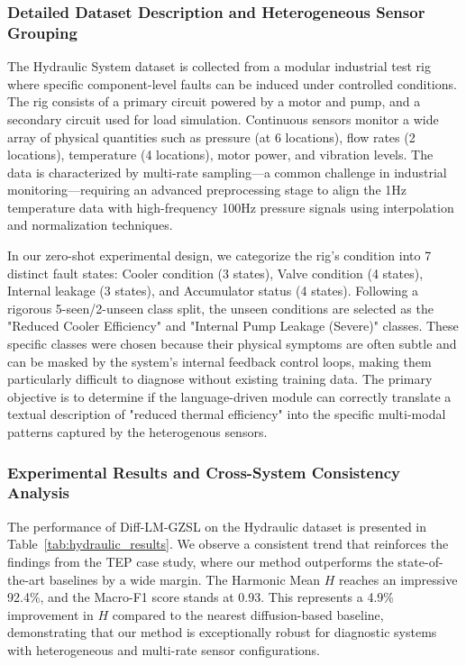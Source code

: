 \documentclass[journal]{IEEEtran}
\begin{document}
\subsubsection{Detailed Dataset Description and Heterogeneous Sensor Grouping}
The Hydraulic System dataset is collected from a modular industrial test rig where specific component-level faults can be induced under controlled conditions. The rig consists of a primary circuit powered by a motor and pump, and a secondary circuit used for load simulation. Continuous sensors monitor a wide array of physical quantities such as pressure (at 6 locations), flow rates (2 locations), temperature (4 locations), motor power, and vibration levels. The data is characterized by multi-rate sampling—a common challenge in industrial monitoring—requiring an advanced preprocessing stage to align the 1Hz temperature data with high-frequency 100Hz pressure signals using interpolation and normalization techniques.

In our zero-shot experimental design, we categorize the rig's condition into 7 distinct fault states: Cooler condition (3 states), Valve condition (4 states), Internal leakage (3 states), and Accumulator status (4 states). Following a rigorous 5-seen/2-unseen class split, the unseen conditions are selected as the "Reduced Cooler Efficiency" and "Internal Pump Leakage (Severe)" classes. These specific classes were chosen because their physical symptoms are often subtle and can be masked by the system's internal feedback control loops, making them particularly difficult to diagnose without existing training data. The primary objective is to determine if the language-driven module can correctly translate a textual description of "reduced thermal efficiency" into the specific multi-modal patterns captured by the heterogenous sensors.

\subsubsection{Experimental Results and Cross-System Consistency Analysis}
The performance of Diff-LM-GZSL on the Hydraulic dataset is presented in Table~\ref{tab:hydraulic_results}. We observe a consistent trend that reinforces the findings from the TEP case study, where our method outperforms the state-of-the-art baselines by a wide margin. The Harmonic Mean $H$ reaches an impressive 92.4\%, and the Macro-F1 score stands at 0.93. This represents a 4.9\% improvement in $H$ compared to the nearest diffusion-based baseline, demonstrating that our method is exceptionally robust for diagnostic systems with heterogeneous and multi-rate sensor configurations.
\end{document}
